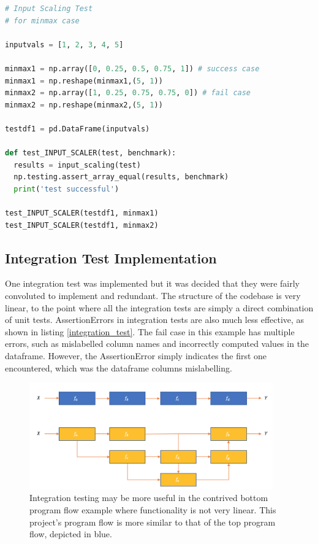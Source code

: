 \documentclass[10pt,onecolumn,letterpaper]{article}
\begin{document}
\begin{lstlisting}[language=Python, breaklines=true, caption={Example of a \textit{numpy} comparison test.}]
# Input Scaling Test
# for minmax case

inputvals = [1, 2, 3, 4, 5]

minmax1 = np.array([0, 0.25, 0.5, 0.75, 1]) # success case
minmax1 = np.reshape(minmax1,(5, 1))
minmax2 = np.array([1, 0.25, 0.75, 0.75, 0]) # fail case
minmax2 = np.reshape(minmax2,(5, 1))

testdf1 = pd.DataFrame(inputvals)

def test_INPUT_SCALER(test, benchmark):
  results = input_scaling(test)
  np.testing.assert_array_equal(results, benchmark)
  print('test successful')

test_INPUT_SCALER(testdf1, minmax1)
test_INPUT_SCALER(testdf1, minmax2)
\end{lstlisting} 

\subsection{Integration Test Implementation} 

One integration test was implemented but it was decided that they were fairly convoluted to implement and redundant. The structure of the codebase is very linear, to the point where all the integration tests are simply a direct combination of unit tests. AssertionErrors in integration tests are also much less effective, as shown in listing \ref{integration_test}. The fail case in this example has multiple errors, such as mislabelled column names and incorrectly computed values in the dataframe. However, the AssertionError simply indicates the first one encountered, which was the dataframe columns mislabelling.   

\begin{figure}[!hbt!]
\centering
\includegraphics[width=10.5cm]{integration_useful.png}
\caption{Integration testing may be more useful in the contrived bottom program flow example where functionality is not very linear. This project's program flow is more similar to that of the top program flow, depicted in blue.}
\label{integration_useful}
\end{figure}
\end{document}
